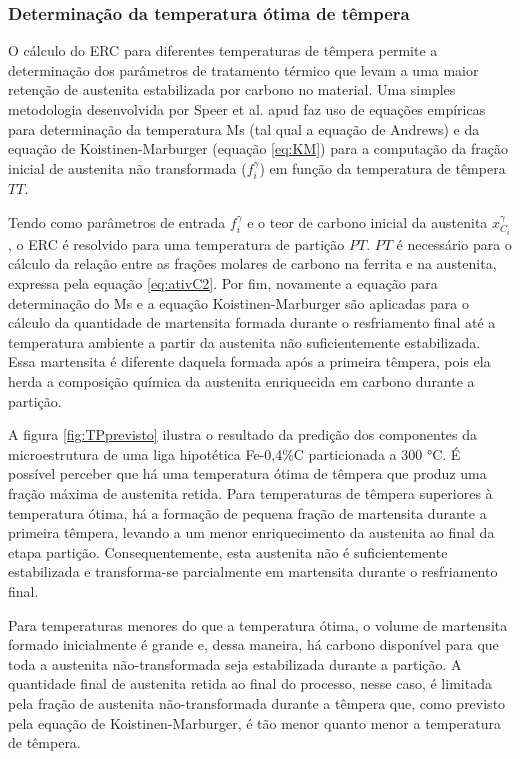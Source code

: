 \subsubsection{Determina\c{c}\~{a}o da temperatura \'{o}tima de t\^{e}mpera}

\label{subsec:tempOtima}

O cálculo do ERC para diferentes temperaturas de têmpera permite a determinação dos parâmetros de tratamento térmico que levam a uma maior retenção de austenita estabilizada por carbono no material. Uma simples metodologia desenvolvida por Speer et al. apud\cite{Edmonds2006} faz uso de equações empíricas para determinação da temperatura Ms (tal qual a equação de Andrews) e da equação de Koistinen-Marburger (equação \ref{eq:KM}) para a computação da fração inicial de austenita não transformada ($f_i^\gamma$) em função da temperatura de têmpera $TT$.

Tendo como parâmetros de entrada $f_i^\gamma$ e o teor de carbono inicial da austenita $x_{C_i}^\gamma$, o ERC é resolvido para uma temperatura de partição $PT$. $PT$ é necessário para o cálculo da relação entre as frações molares de carbono na ferrita e na austenita, expressa pela equação \ref{eq:ativC2}. Por fim, novamente a equação para determinação do Ms e a equação Koistinen-Marburger são aplicadas para o cálculo da quantidade de martensita formada durante o resfriamento final até a temperatura ambiente a partir da austenita não suficientemente estabilizada. Essa martensita é diferente daquela formada após a primeira têmpera, pois ela herda a composição química da austenita enriquecida em carbono durante a partição.

A figura \ref{fig:TPprevisto} ilustra o resultado da predição dos componentes da microestrutura de uma liga hipotética Fe-0,4\%C particionada a 300 °C. É possível perceber que há uma temperatura ótima de têmpera que produz uma fração máxima de austenita retida. Para temperaturas de têmpera superiores à temperatura ótima, há a formação de pequena fração de martensita durante a primeira têmpera, levando a um menor enriquecimento da austenita ao final da etapa partição. Consequentemente, esta austenita não é suficientemente estabilizada e transforma-se parcialmente em martensita durante o resfriamento final.

Para temperaturas menores do que a temperatura ótima, o volume de martensita formado inicialmente é grande e, dessa maneira, há carbono disponível para que toda a austenita não-transformada seja estabilizada durante a partição. A quantidade final de austenita retida ao final do processo, nesse caso, é limitada pela fração de austenita não-transformada durante a têmpera que, como previsto pela equação de Koistinen-Marburger, é tão menor quanto menor a temperatura de têmpera.

